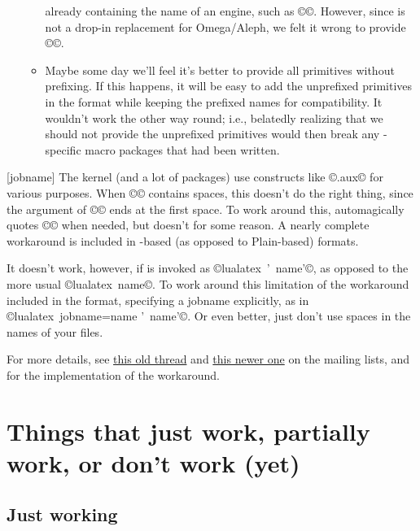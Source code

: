 \documentclass{lltxdoc}
\begin{document}
\begin{myquote}
\begin{enumerate}
\begin{itemize}
          already containing the name of an engine, such as
          ©\luatexOmegaVersion©.  However, since \luatex is not a drop-in
          replacement for Omega/Aleph, we felt it wrong to provide
          ©\OmegaVersion©.
        \item Maybe some day we'll feel it's better to provide all primitives
          without prefixing. If this happens, it will be easy to add the
          unprefixed primitives in the format while keeping the prefixed names
          for compatibility. It wouldn't work the other way round; i.e.,
          belatedly realizing that we should not provide the unprefixed
          primitives would then break any \luatex-specific macro packages
          that had been written.
      \end{itemize}
  \end{enumerate}
\end{myquote}

[jobname]
The \latex kernel (and a lot of packages) use constructs like
©\jobname.aux© for various purposes. When ©\jobname© contains spaces,
this doesn't do the right thing, since the argument of ©© ends at the
first space. To work around this, \pdftex automagically quotes ©\jobname© when
needed, but \luatex doesn't for some reason. A nearly complete workaround is
included in \latex-based (as opposed to Plain-based) \luatex formats.

It doesn't work, however, if \luatex is invoked as ©lualatex ' name'©,
as opposed to the more usual ©lualatex name©. To work around this
limitation of the workaround included in the format, specifying a jobname
explicitly, as in ©lualatex jobname=name ' name'©. Or even better, just
don't use spaces in the names of your \tex files.

For more details, see
\href{http://www.ntg.nl/pipermail/dev-luatex/2009-April/002549.html}{this old
  thread} and
\href{http://tug.org/pipermail/luatex/2010-August/001986.html}{this newer one}
on the \luatex mailing lists, and  for the
implementation of the workaround.


\section{Things that just work, partially work, or don't work (yet)}
\label{workornot}

\subsection{Just working}\label{working}
\end{document}
